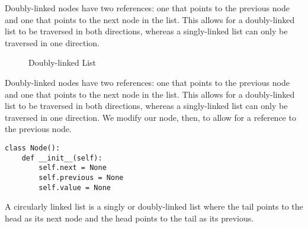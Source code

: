 Doubly-linked nodes have two references:
one that points to the previous node and one that points to the next node in the list.
This allows for a doubly-linked list to be traversed in both directions, whereas a singly-linked list can only be traversed in one direction.

\begin{figure}[!h]
\centering
{}
\caption{Doubly-linked List}
\label{Doubly-linked List}
\end{figure}

Doubly-linked nodes have two references:
one that points to the previous node and one that points to the next node in the list.
This allows for a doubly-linked list to be traversed in both directions, whereas a singly-linked list can only be traversed in one direction. We modify our node, then, to allow for a reference to the previous node.

\begin{lstlisting}
class Node():
    def __init__(self):
        self.next = None
        self.previous = None
        self.value = None
\end{lstlisting}

A circularly linked list is a singly or doubly-linked list where the tail points to the head as its next node and the head points to the tail as its previous.

